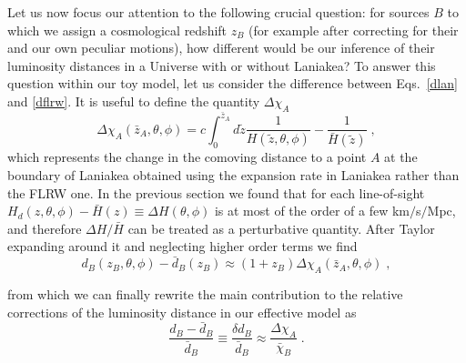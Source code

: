 \documentclass[notitlepage,nofootinbib]{revtex4-1}
\begin{document}
Let us now focus our attention to the following crucial question: for sources $B$ to which we assign a cosmological redshift $z_B$ (for example after correcting for their and our own peculiar motions), how different would be our inference of their luminosity distances in a Universe with or without Laniakea?
To answer this question within our toy model, let us consider the difference between Eqs.~\eqref{dlan} and \eqref{dflrw}. It is useful to define the quantity $\Delta \chi_A$
\begin{equation}\label{deltachi}
    \Delta \chi_A(\bar{z}_A,\theta,\phi) = c\int_0^{\bar{z}_A}d\tilde{z}\frac{1}{H\left(\tilde{z},\theta,\phi\right)} -\frac{1}{\bar{H}(\tilde{z})}\;,
\end{equation}
which represents the change in the comoving distance to a point $A$ at the boundary of Laniakea obtained using the expansion rate in Laniakea rather than the FLRW one. In the previous section we found that for each line-of-sight $H_d(z,\theta,\phi)-\bar{H}(z)\equiv \Delta H(\theta,\phi)$ is at most of the order of a few km$/$s$/$Mpc, and therefore $\Delta H/\bar{H}$ can be treated as a perturbative quantity. After Taylor expanding around it and neglecting higher order terms we find 
\begin{equation}\label{d-d}
 d_B(z_B,\theta,\phi) - \bar{d}_B(z_B) \approx  \left(1+z_B\right)\Delta \chi_A(\bar{z}_A,\theta,\phi) \;,  
\end{equation}

from which we can finally rewrite the main contribution to the relative corrections of the luminosity distance in our effective model as
\begin{equation}\label{deltad}
    \frac{ d_B - \bar{d}_B}{\bar{d}_B}\equiv \frac{\delta d_B}{\bar{d}_B} \approx \frac{\Delta\chi_A}{\bar{\chi}_B}\;.
\end{equation}
\end{document}
